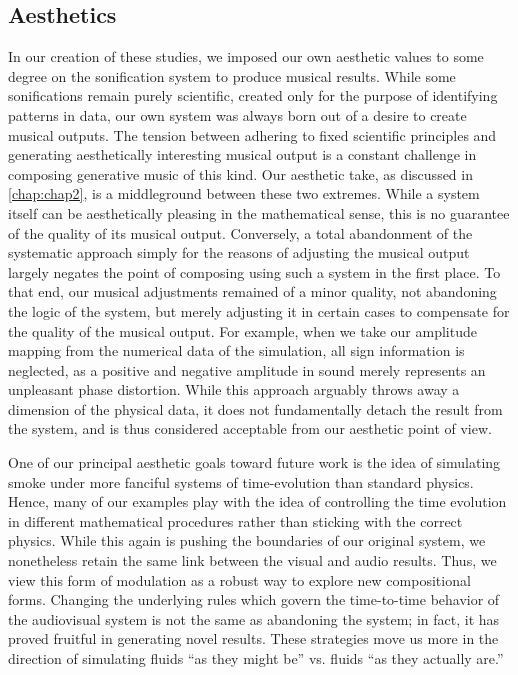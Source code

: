 \subsection{Aesthetics}
In our creation of these studies, we imposed our own aesthetic values to some degree on the sonification system to produce musical results. While some sonifications remain purely scientific, created only for the purpose of identifying patterns in data, our own system was always born out of a desire to create musical outputs. The tension between adhering to fixed scientific principles and generating aesthetically interesting musical output is  a constant challenge in composing generative music of this kind. Our aesthetic take, as discussed in \ref{chap:chap2}, is a middleground between these two extremes. While a system itself can be aesthetically pleasing in the mathematical sense, this is no guarantee of the quality of its musical output. Conversely, a total abandonment of the systematic approach simply for the reasons of adjusting the musical output largely negates the point of composing using such a system in the first place. To that end, our musical adjustments remained of a minor quality, not abandoning the logic of the system, but merely adjusting it in certain cases to compensate for the quality of the musical output. For example, when we take our amplitude mapping from the numerical data of the simulation, all sign information is neglected, as a positive and negative amplitude in sound merely represents an unpleasant phase distortion. While this approach arguably throws away a dimension of the physical data, it does not fundamentally detach the result from the system, and is thus considered acceptable from our aesthetic point of view.

One of our principal aesthetic goals toward future work is the idea of simulating smoke under more fanciful systems of time-evolution than standard physics. Hence, many of our examples play with the idea of controlling the time evolution in different mathematical procedures rather than sticking with the correct physics. While this again is pushing the boundaries of our original system, we nonetheless retain the same link between the visual and audio results. Thus, we view this form of modulation as
a robust way to explore new compositional forms. Changing the underlying rules which govern the time-to-time behavior of the audiovisual system is not the same as abandoning the system; in fact, it has proved fruitful in generating novel results. These strategies move us more in the direction of simulating fluids ``as they might be'' vs. fluids ``as they actually are.''